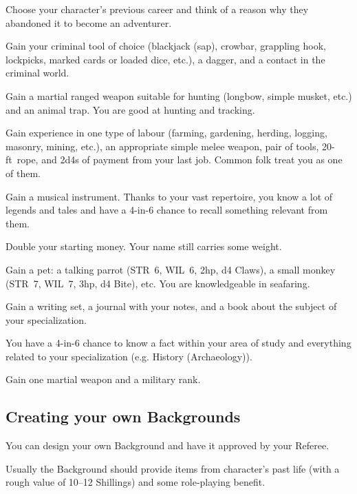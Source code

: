\documentclass[itdr]{subfiles}
\begin{document}
Choose your character's previous career and think of a reason why they abandoned it to become an \mbox{adventurer}.

\vfill
{}
Gain your criminal tool of choice (blackjack (sap), crowbar, grappling hook, lockpicks, marked cards or loaded dice, etc.), a dagger, and a contact in the criminal world.

\vfill
{}
Gain a martial ranged weapon suitable for hunting (longbow, simple musket, etc.) and an animal trap. You are good at hunting and tracking.

\vfill
{}
Gain experience in one type of labour (farming, gardening, herding, logging, masonry, mining, etc.), an appropriate simple melee weapon, pair of tools, \mbox{20-ft rope}, and 2d4s of payment from your last job. \mbox{Common} folk treat you as one of them.

\vfill
{}
Gain a musical instrument. Thanks to your vast repertoire, you know a lot of legends and tales and have a 4-in-6 chance to recall something relevant from them.

\vfill
{}
Double your starting money. Your name still carries some weight.

\vfill
{}
Gain a pet: a talking parrot (STR~6, WIL~6, 2hp, d4 Claws), a small monkey (STR~7, WIL~7, 3hp, d4 Bite), etc. You are knowledgeable in seafaring.

\vfill
{}
Gain a writing set, a journal with your notes, and a book about the subject of your specialization.

You have a 4-in-6 chance to know a fact within your area of study and everything related to your specialization (e.g. History (Archaeology)).

\vfill
{}
Gain one martial weapon and a military rank.

\vfill
\break

\begin{dbox}
\subsection*{Creating your own Backgrounds}

You can design your own Background and have it approved by your Referee.

Usually the Background should provide items from character's past life (with a rough value of 10--12 Shillings) and some role-playing benefit.
\end{dbox}
\end{document}
